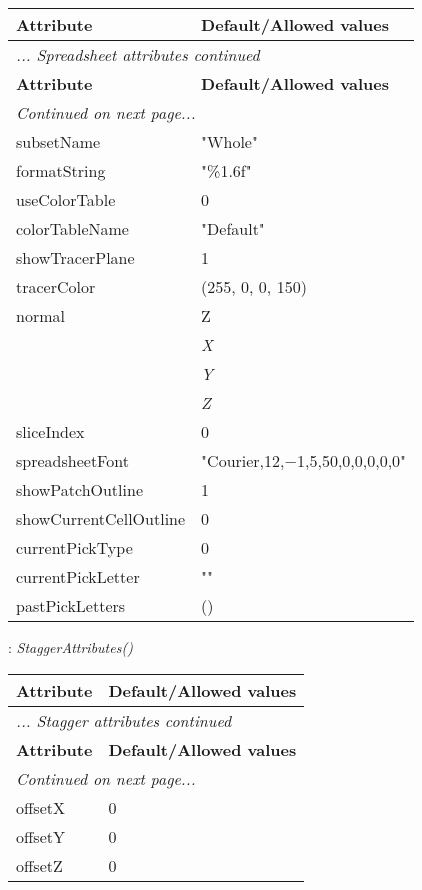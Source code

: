 \documentclass[10pt,a4paper]{report}
\begin{document}
\begin{longtable}{ll}
{\bf Attribute} & {\bf Default/Allowed values} \\
\hline \hline
\endfirsthead
\multicolumn{2}{l}{{\it ... Spreadsheet attributes continued}} \\
{\bf Attribute} & {\bf Default/Allowed values} \\
\hline \hline
\endhead
\hline
\multicolumn{2}{l}{{\it Continued on next page...}} \\
\endfoot
\hline
\endlastfoot

subsetName  &  "Whole" \\
formatString  &  "\%1.6f" \\
useColorTable  &  0 \\
colorTableName  &  "Default" \\
showTracerPlane  &  1 \\
tracerColor  &  (255, 0, 0, 150) \\
normal  &  Z   \\
 & {\it  X} \\
 & {\it  Y} \\
 & {\it  Z} \\
sliceIndex  &  0 \\
spreadsheetFont  &  "Courier,12,$-$1,5,50,0,0,0,0,0" \\
showPatchOutline  &  1 \\
showCurrentCellOutline  &  0 \\
currentPickType  &  0 \\
currentPickLetter  &  "" \\
pastPickLetters  &  () \\
\end{longtable}

\newpage

{}
: {\it StaggerAttributes() }\\[-3mm]

\begin{longtable}{ll}
{\bf Attribute} & {\bf Default/Allowed values} \\
\hline \hline
\endfirsthead
\multicolumn{2}{l}{{\it ... Stagger attributes continued}} \\
{\bf Attribute} & {\bf Default/Allowed values} \\
\hline \hline
\endhead
\hline
\multicolumn{2}{l}{{\it Continued on next page...}} \\
\endfoot
\hline
\endlastfoot

offsetX  &  0 \\
offsetY  &  0 \\
offsetZ  &  0 \\
\end{longtable}
\end{document}
